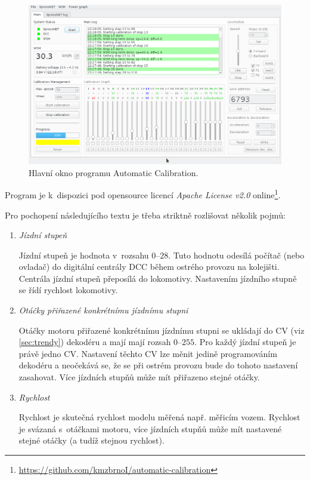 \begin{figure}[h]
\includegraphics[width=\textwidth]{data/ac_progress.png}
\caption{Hlavní okno programu Automatic Calibration.}
\label{fig:ac-gui}
\end{figure}

Program je k~dispozici pod opensource licencí \textit{Apache License v2.0}
online\footnote{\url{https://github.com/kmzbrnoI/automatic-calibration}}.

Pro pochopení následujícího textu je třeba striktně rozlišovat několik pojmů:

\begin{enumerate}
\item \textit{Jízdní stupeň}

Jízdní stupeň je hodnota v~rozsahu $0$--$28$. Tuto hodnotu odesílá počítač
(nebo ovladač) do digitální centrály DCC během ostrého provozu na kolejišti.
Centrála jízdní stupeň přeposílá do lokomotivy. Nastavením jízdního stupně
se řídí rychlost lokomotivy.

\item \textit{Otáčky přiřazené konkrétnímu jízdnímu stupni}

Otáčky motoru přiřazené konkrétnímu jízdnímu stupni se ukládají do CV (viz
\ref{sec:trendy}) dekodéru a mají mají rozsah $0$--$255$. Pro každý jízdní
stupeň je právě jedno CV. Nastavení těchto CV lze měnit jedině programováním
dekodéru a neočekává se, že se při ostrém provozu bude do tohoto nastavení
zasahovat. Více jízdních stupňů může mít přiřazeno stejné otáčky.

\item \textit{Rychlost}

Rychlost je skutečná rychlost modelu měřená např. měřicím vozem. Rychlost
je svázaná s~otáčkami motoru, více jízdních stupňů může mít nastavené
stejné otáčky (a tudíž stejnou rychlost).

\end{enumerate}

